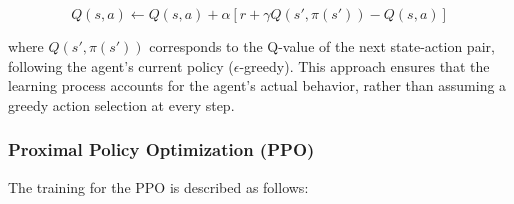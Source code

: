 \documentclass[../CSC_52081_EP.tex]{subfiles}
\begin{document}
\begin{equation}
        Q(s, a) \leftarrow Q(s, a) + \alpha \left[ r + \gamma Q(s', \pi(s')) - Q(s, a) \right]
    \end{equation}

where $Q(s', \pi(s'))$ corresponds to the Q-value of the next state-action pair, following the agent’s current policy ($\epsilon$-greedy). This approach ensures that the learning process accounts for the agent’s actual behavior, rather than assuming a greedy action selection at every step.

\hspace{1cm}

\subsubsection{Proximal Policy Optimization (PPO)}
The training for the PPO is described as follows:
\end{document}
